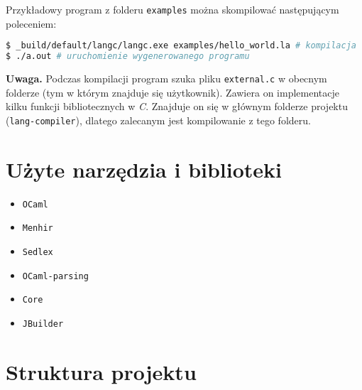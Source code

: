 \documentclass[declaration,shortabstract]{iithesis}
\begin{document}
Przykładowy program z folderu \texttt{examples} można skompilować następującym 
poleceniem: 
\begin{lstlisting}[language=bash]
$ _build/default/langc/langc.exe examples/hello_world.la # kompilacja 
$ ./a.out # uruchomienie wygenerowanego programu 
\end{lstlisting}

\textbf{Uwaga.} Podczas kompilacji program szuka pliku \texttt{external.c} w 
obecnym folderze (tym w którym znajduje się użytkownik). Zawiera on  
implementacje kilku funkcji bibliotecznych w \textit{C}. Znajduje on się w 
głównym folderze projektu (\texttt{lang-compiler}), dlatego zalecanym jest 
kompilowanie z tego folderu.

\section{Użyte narzędzia i biblioteki}

\begin{itemize}
  \item \texttt{OCaml}
  \item \texttt{Menhir}
  \item \texttt{Sedlex}
  \item \texttt{OCaml-parsing}
  \item \texttt{Core} 
  \item \texttt{JBuilder} 
\end{itemize}



\section{Struktura projektu}
\end{document}
